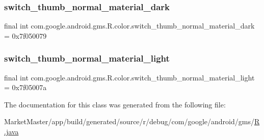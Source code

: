 \subsubsection{\texorpdfstring{switch\+\_\+thumb\+\_\+normal\+\_\+material\+\_\+dark}{switch\_thumb\_normal\_material\_dark}}
{\footnotesize\ttfamily final int com.\+google.\+android.\+gms.\+R.\+color.\+switch\+\_\+thumb\+\_\+normal\+\_\+material\+\_\+dark = 0x7f050079\hspace{0.3cm}{\ttfamily [static]}}

\mbox{\label{classcom_1_1google_1_1android_1_1gms_1_1R_1_1color_a7c46f67bbe3048e49bc7c0876a402c5f}} 
\subsubsection{\texorpdfstring{switch\+\_\+thumb\+\_\+normal\+\_\+material\+\_\+light}{switch\_thumb\_normal\_material\_light}}
{\footnotesize\ttfamily final int com.\+google.\+android.\+gms.\+R.\+color.\+switch\+\_\+thumb\+\_\+normal\+\_\+material\+\_\+light = 0x7f05007a\hspace{0.3cm}{\ttfamily [static]}}



The documentation for this class was generated from the following file\+:\begin{DoxyCompactItemize}
\item 
Market\+Master/app/build/generated/source/r/debug/com/google/android/gms/\mbox{\hyperlink{debug_2com_2google_2android_2gms_2R_8java}{R.\+java}}\end{DoxyCompactItemize}
